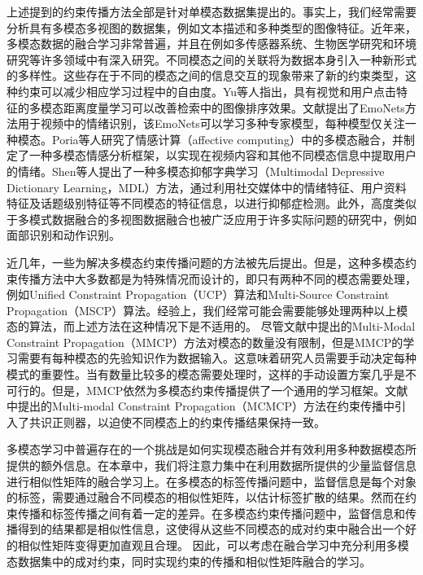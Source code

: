 上述提到的约束传播方法全部是针对单模态数据集提出的。事实上，我们经常需要分析具有多模态多视图的数据集，例如文本描述和多种类型的图像特征。近年来，多模态数据的融合学习非常普遍，并且在例如多传感器系统、生物医学研究和环境研究等许多领域中有深入研究。不同模态之间的关联将为数据本身引入一种新形式的多样性。这些存在于不同的模态之间的信息交互的现象带来了新的约束类型，这种约束可以减少相应学习过程中的自由度\cite{lahat2015multimodal}。Yu等人指出，具有视觉和用户点击特征的多模态距离度量学习可以改善检索中的图像排序效果\cite{yu2017deep}。文献\parencite{kahou2016emonets}提出了EmoNets方法用于视频中的情绪识别，该EmoNets可以学习多种专家模型，每种模型仅关注一种模态。Poria等人研究了情感计算（affective computing）中的多模态融合，并制定了一种多模态情感分析框架，以实现在视频内容和其他不同模态信息中提取用户的情绪\cite{poria2017review,poria2017ensemble}。Shen等人提出了一种多模态抑郁字典学习（Multimodal Depressive Dictionary Learning，MDL）\cite{shen2017depression}方法，通过利用社交媒体中的情绪特征、用户资料特征及话题级别特征等不同模态的特征信息，以进行抑郁症检测。此外，高度类似于多模式数据融合的多视图数据融合也被广泛应用于许多实际问题的研究中，例如面部识别\cite{kan2016multi}和动作识别\cite{shao2016kernelized}。

近几年，一些为解决多模态约束传播问题的方法被先后提出\cite{fu2011multi,fu2012modalities,lu2013unified,lu2013exhaustive}。但是，这种多模态约束传播方法中大多数都是为特殊情况而设计的，即只有两种不同的模态需要处理，例如Unified Constraint Propagation（UCP）\cite{lu2013unified}算法和Multi-Source Constraint Propagation（MSCP）\cite{lu2013exhaustive}算法。经验上，我们经常可能会需要能够处理两种以上模态的算法，而上述方法在这种情况下是不适用的。
尽管文献\parencite{fu2011multi}中提出的Multi-Modal Constraint Propagation（MMCP）方法对模态的数量没有限制，但是MMCP的学习需要有每种模态的先验知识作为数据输入。这意味着研究人员需要手动决定每种模式的重要性。当有数量比较多的模态需要处理时，这样的手动设置方案几乎是不可行的。但是，MMCP依然为多模态约束传播提供了一个通用的学习框架。文献\parencite{fu2012modalities}中提出的Multi-modal Constraint Propagation（MCMCP）方法在约束传播中引入了共识正则器，以迫使不同模态上的约束传播结果保持一致。

多模态学习中普遍存在的一个挑战是如何实现模态融合并有效利用多种数据模态所提供的额外信息。在本章中，我们将注意力集中在利用数据所提供的少量监督信息进行相似性矩阵的融合学习上。在多模态的标签传播问题中，监督信息是每个对象的标签，需要通过融合不同模态的相似性矩阵，以估计标签扩散的结果。然而在约束传播和标签传播之间有着一定的差异。在多模态约束传播问题中，监督信息和传播得到的结果都是相似性信息，这使得从这些不同模态的成对约束中融合出一个好的相似性矩阵变得更加直观且合理。 因此，可以考虑在融合学习中充分利用多模态数据集中的成对约束，同时实现约束的传播和相似性矩阵融合的学习。

